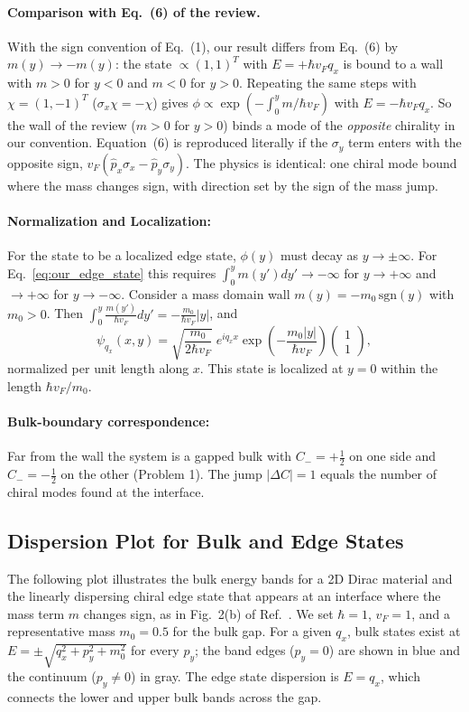 \documentclass{article}
\begin{document}
	\paragraph{Comparison with Eq.~(6) of the review.} With the sign convention of Eq.~(1), our result differs from Eq.~(6) by $m(y) \to -m(y)$: the state $\propto (1,1)^T$ with $E = +\hbar v_F q_x$ is bound to a wall with $m>0$ for $y<0$ and $m<0$ for $y>0$. Repeating the same steps with $\chi = (1,-1)^T$ ($\sigma_x\chi = -\chi$) gives $\phi \propto \exp(-\int_0^y m/\hbar v_F)$ with $E = -\hbar v_F q_x$. So the wall of the review ($m>0$ for $y>0$) binds a mode of the \emph{opposite} chirality in our convention. Equation~(6) is reproduced literally if the $\sigma_y$ term enters with the opposite sign, $v_F(\hat p_x\sigma_x - \hat p_y\sigma_y)$. The physics is identical: one chiral mode bound where the mass changes sign, with direction set by the sign of the mass jump.

	\paragraph{Normalization and Localization:}
	For the state to be a localized edge state, $\phi(y)$ must decay as $y \to \pm\infty$. For Eq.~\eqref{eq:our_edge_state} this requires $\int_0^y m(y')dy' \to -\infty$ for $y\to+\infty$ and $\to +\infty$ for $y \to -\infty$.
	Consider a mass domain wall $m(y) = -m_0 \,\mathrm{sgn}(y)$ with $m_0 > 0$.
	Then $\int_0^y \frac{m(y')}{\hbar v_F} dy' = -\frac{m_0}{\hbar v_F} |y|$, and
	\begin{equation}
		\psi_{q_x}(x,y) = \sqrt{\frac{m_0}{2\hbar v_F}}\; e^{i q_x x} \exp\left(-\frac{m_0|y|}{\hbar v_F}\right)\begin{pmatrix} 1 \\ 1 \end{pmatrix},
	\end{equation}
	normalized per unit length along $x$. This state is localized at $y=0$ within the length $\hbar v_F/m_0$.

	\paragraph{Bulk-boundary correspondence:} Far from the wall the system is a gapped bulk with $C_- = +\frac{1}{2}$ on one side and $C_- = -\frac{1}{2}$ on the other (Problem 1). The jump $|\Delta C| = 1$ equals the number of chiral modes found at the interface.

	\subsection{Dispersion Plot for Bulk and Edge States}
	The following plot illustrates the bulk energy bands for a 2D Dirac material and the linearly dispersing chiral edge state that appears at an interface where the mass term $m$ changes sign, as in Fig.~2(b) of Ref.~\cite{HK}. We set $\hbar=1$, $v_F=1$, and a representative mass $m_0=0.5$ for the bulk gap. For a given $q_x$, bulk states exist at $E = \pm\sqrt{q_x^2 + p_y^2 + m_0^2}$ for every $p_y$; the band edges ($p_y=0$) are shown in blue and the continuum ($p_y\neq0$) in gray. The edge state dispersion is $E=q_x$, which connects the lower and upper bulk bands across the gap.
\end{document}
